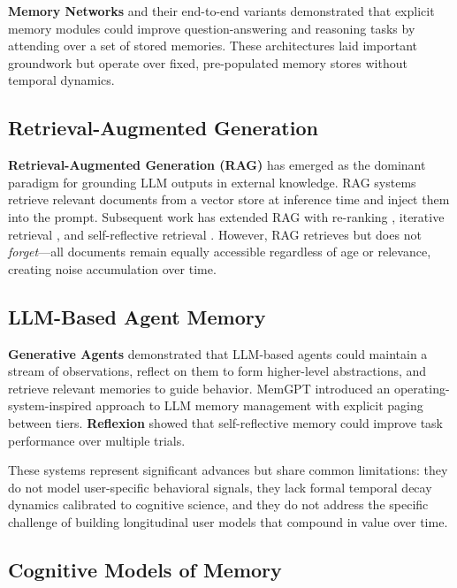 \documentclass[11pt,a4paper]{article}
\begin{document}
\textbf{Memory Networks} \citep{weston2015memory} and their end-to-end variants \citep{sukhbaatar2015end} demonstrated that explicit memory modules could improve question-answering and reasoning tasks by attending over a set of stored memories. These architectures laid important groundwork but operate over fixed, pre-populated memory stores without temporal dynamics.

\subsection{Retrieval-Augmented Generation}

\textbf{Retrieval-Augmented Generation (RAG)} \citep{lewis2020retrieval} has emerged as the dominant paradigm for grounding LLM outputs in external knowledge. RAG systems retrieve relevant documents from a vector store at inference time and inject them into the prompt. Subsequent work has extended RAG with re-ranking \citep{nogueira2019passage}, iterative retrieval \citep{trivedi2023interleaving}, and self-reflective retrieval \citep{asai2024selfrag}. However, RAG retrieves but does not \textit{forget}---all documents remain equally accessible regardless of age or relevance, creating noise accumulation over time.

\subsection{LLM-Based Agent Memory}

\textbf{Generative Agents} \citep{park2023generative} demonstrated that LLM-based agents could maintain a stream of observations, reflect on them to form higher-level abstractions, and retrieve relevant memories to guide behavior. MemGPT \citep{packer2023memgpt} introduced an operating-system-inspired approach to LLM memory management with explicit paging between tiers. \textbf{Reflexion} \citep{shinn2023reflexion} showed that self-reflective memory could improve task performance over multiple trials.

These systems represent significant advances but share common limitations: they do not model user-specific behavioral signals, they lack formal temporal decay dynamics calibrated to cognitive science, and they do not address the specific challenge of building longitudinal user models that compound in value over time.

\subsection{Cognitive Models of Memory}
\end{document}

